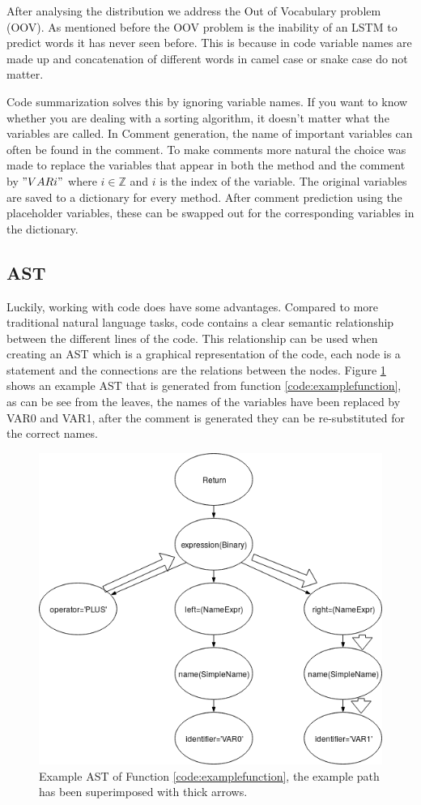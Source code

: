 \documentclass[a4paper,10pt]{article}
\theoremstyle{plain}
\theoremstyle{definition}
\begin{document}
\begin{multicols*}{2}
After analysing the distribution we address the Out of Vocabulary problem (OOV). As mentioned before the OOV problem is the inability of an LSTM to predict words it has never seen before. This is because in code variable names are made up and  concatenation of different words in camel case or snake case do not matter.

Code summarization solves this by ignoring variable names. If you want to know whether you are dealing with a sorting algorithm, it doesn't matter what the variables are called. 
In Comment generation, the name of important variables can often be found in the comment. To make comments more natural the choice was made to replace the variables that appear in both the method and the comment by $"VARi"$ where $i \in \mathbb{Z}$ and $i$ is the index of the variable. The original variables are saved to a dictionary for every method. After comment prediction using the placeholder variables, these can be swapped out for the corresponding variables in the dictionary.


\subsection{AST}
\label{AST}
Luckily, working with code does have some advantages. Compared to more traditional natural language tasks, code contains a clear semantic relationship between the different lines of the code. This relationship can be used when creating an AST which is a graphical representation of the code, each node is a statement and the connections are the relations between the nodes. Figure \ref{fig:exampleAST} shows an example AST that is generated from function \ref{code:examplefunction}, as can be see from the leaves, the names of the variables have been replaced by VAR0 and VAR1, after the comment is generated they can be re-substituted for the correct names.

\begin{figure}[H]
    \centering
    \includegraphics[width = 0.8\linewidth]{Embedding.png}
    \caption{Example AST of Function \ref{code:examplefunction}, the example path has been superimposed with thick arrows.}
    \label{fig:exampleAST}
\end{figure}


\end{multicols*}
\end{document}
